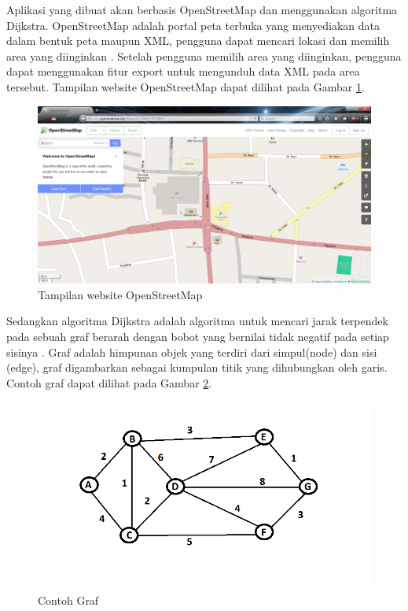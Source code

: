 Aplikasi yang dibuat akan berbasis OpenStreetMap dan menggunakan 
algoritma Dijkstra. OpenStreetMap adalah portal peta terbuka yang menyediakan data dalam bentuk 
peta maupun XML, pengguna dapat mencari lokasi dan memilih area yang diinginkan
. Setelah pengguna memilih area yang diinginkan, pengguna dapat menggunakan
fitur export untuk mengunduh data XML pada area tersebut. Tampilan website
OpenStreetMap dapat dilihat pada Gambar \ref{fig:web_osm}.
\begin{figure}[h]
\centering
\includegraphics[scale=0.3]{Gambar/web_osm}
\caption[Tampilan website OpenStreetMap]{Tampilan website OpenStreetMap
\footnotemark[1]}
\label{fig:web_osm}
\end{figure}
Sedangkan algoritma Dijkstra adalah algoritma untuk mencari jarak terpendek pada
sebuah graf berarah dengan bobot yang bernilai tidak negatif pada setiap sisinya
\cite{Cormen:2001}. Graf adalah himpunan objek yang terdiri dari simpul(node)
dan sisi (edge), graf digambarkan sebagai kumpulan titik yang dihubungkan oleh garis. 
Contoh graf dapat dilihat pada Gambar \ref{fig:co_graf}.
\begin{figure}[h]
\centering
\includegraphics[scale=0.4]{Gambar/co_graf}
\caption[Contoh Graf]{Contoh Graf}
\label{fig:co_graf}
\end{figure}

